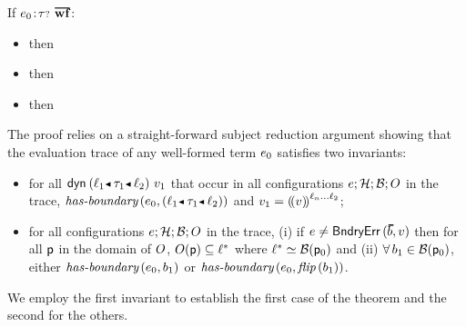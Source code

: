 \begin{theorem}\label{T-all-path-blame-soundness}
  If\/ $\fwellformedO{\sexpr_0}{\stoptional}$:
  \begin{itemize}
    \item \Tdyn{} then \Tdynitems
    \item \Tapp{} then \Tappitems
    \item \Tchecka{} then \Tcheckitemsa
  \end{itemize}
\end{theorem}
\begin{proofsketch}
  The proof relies on a straight-forward subject reduction
  argument showing that the evaluation trace of any well-formed term $e_0$ satisfies two
  invariants:
  \begin{itemize}
  \item
  for all
  $\edynb{\obnd{\sowner_1}{\stype_1}{\sowner_2}}{\svalue_1}$
  that occur in all configurations $e; \mathcal{H}; \mathcal{B}; O$ in the trace, 
      \(\fhasbnd{\sexpr_0}{\obnd{\sowner_1}{\stype_1}{\sowner_2}}\)
      and
        \( v_1 = {(\!( v)\!)}^{\ell_n...\ell_2}\);
   \item
   for all configurations 
  $e; \mathcal{H}; \mathcal{B}; O$ in the trace, (i) 
  if $\sexpr\neq\boundaryerror{\sblist}{\svalue}$ then
  for all 
  $\mathsf{p}$ in the domain of $O$,
  $O(\mathsf{p}) \subseteq \ell^*$
  where $\ell^* \simeq \mathcal{B}(\mathsf{p}_0)$ and (ii) 
\(\forall\,b_1 \in \mathcal{B}(\mathsf{p}_0)\),  either 
  \(\textit{has-boundary}\,(e_0, b_1)\) or
  \(\textit{has-boundary}\,(e_0, \textit{flip}\,(b_1))\).
  \end{itemize}
    We employ the first invariant to establish the first case of the
    theorem and the second for the others.
\end{proofsketch}


\newcommand{\Tcheckitemsanot}{%
  \begin{enumerate}
        \item
      \(\forall\,\sbnd_1 \in \sblist_1\),  either \(\fhasbnd{\sexpr_0}{\sbnd_1}\) or \(\fhasbnd{\sexpr_0}{\fflip{\sbnd_1}}\)
    \item
         $\svalue_0 = \obbars{\svalue_1}{\sowner^*}$, $\svalue
         \neq \eloc$, $ \rbstoresimbasic{\sowner_1 ... \sowner_n}{\sblist_1}$ 
         and $\sowner_1 ... \sowner_n \not \supseteq \lstore_1(\eloc_1) \cup
         \sowner^*$.
  \end{enumerate}}

